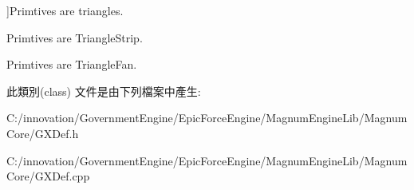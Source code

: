\begin{Desc}
\begin{description}
{}]Primtives are triangles. \item[{\em 
Triangle\+Strip\hypertarget{class_i_dream_sky_1_1_g_x_draw_mode_a4f82f9452579607d7ee72b8102057bfdaadae18f44cb8ca352626c6c80074dfe4}{}\label{class_i_dream_sky_1_1_g_x_draw_mode_a4f82f9452579607d7ee72b8102057bfdaadae18f44cb8ca352626c6c80074dfe4}
}]Primtives are Triangle\+Strip. \item[{\em 
Triangle\+Fan\hypertarget{class_i_dream_sky_1_1_g_x_draw_mode_a4f82f9452579607d7ee72b8102057bfda5697f40902d09a3f4b4febbc383bbe01}{}\label{class_i_dream_sky_1_1_g_x_draw_mode_a4f82f9452579607d7ee72b8102057bfda5697f40902d09a3f4b4febbc383bbe01}
}]Primtives are Triangle\+Fan. \end{description}
\end{Desc}


此類別(class) 文件是由下列檔案中產生\+:\begin{DoxyCompactItemize}
\item 
C\+:/innovation/\+Government\+Engine/\+Epic\+Force\+Engine/\+Magnum\+Engine\+Lib/\+Magnum\+Core/G\+X\+Def.\+h\item 
C\+:/innovation/\+Government\+Engine/\+Epic\+Force\+Engine/\+Magnum\+Engine\+Lib/\+Magnum\+Core/G\+X\+Def.\+cpp\end{DoxyCompactItemize}
